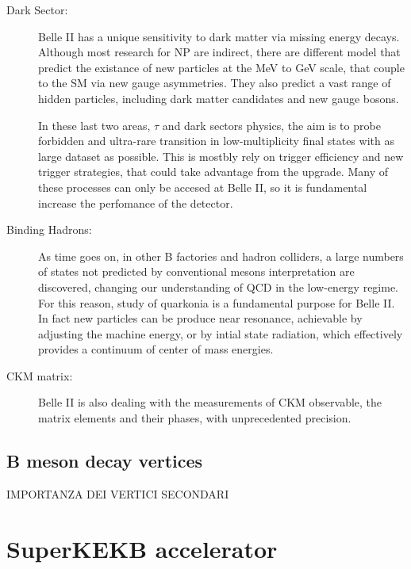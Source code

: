 \begin{description}
\item[Dark Sector:] Belle II has a unique sensitivity to dark matter via missing energy decays. Although most research for NP are indirect, there are different model that predict the existance of new particles at the MeV to GeV scale, that couple to the SM via new gauge asymmetries. They also predict a vast range of hidden particles, including dark matter candidates and new gauge bosons.

In these last two areas, $\tau$ and dark sectors physics, the aim is to probe forbidden and ultra-rare transition in low-multiplicity final states with as large dataset as possible. This is mostbly rely on trigger efficiency and new trigger strategies, that could take advantage from the upgrade. Many of these processes can only be accesed at Belle II, so it is fundamental increase the perfomance of the detector.

\item[Binding Hadrons:] As time goes on, in other B factories and hadron colliders, a large numbers of states not predicted by conventional mesons interpretation are discovered, changing our understanding of QCD in the low-energy regime. For this reason, study of quarkonia is a fundamental purpose for Belle II. In fact new particles can be produce near resonance, achievable by adjusting the machine energy, or by intial state radiation, which effectively provides a continuum of center of mass energies. 

\item[CKM matrix:] Belle II is also dealing with the measurements of CKM observable, the matrix elements and their phases, with unprecedented precision. 

\end{description}


\subsection{B meson decay vertices}

IMPORTANZA DEI VERTICI SECONDARI


\newpage





\section{SuperKEKB accelerator}

